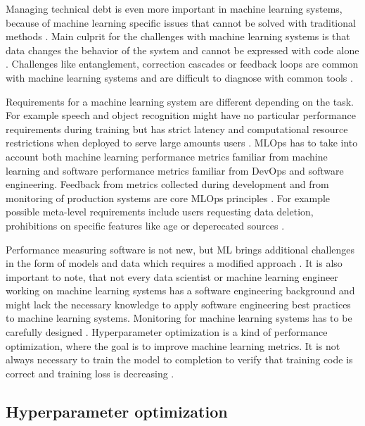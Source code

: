 Managing technical debt is even more important in machine learning systems, because of machine learning specific issues that cannot be solved with traditional methods \parencite{sculleyHiddenTechnicalDebt2015a}. Main culprit for the challenges with machine learning systems is that data changes the behavior of the system and cannot be expressed with code alone \parencite{sculleyHiddenTechnicalDebt2015a}. Challenges like entanglement, correction cascades or feedback loops are common with machine learning systems and are difficult to diagnose with common tools \parencite{sculleyHiddenTechnicalDebt2015a}.

Requirements for a machine learning system are different depending on the task. For example speech and object recognition might have no particular performance requirements during training but has strict latency and computational resource restrictions when deployed to serve large amounts users \parencite{hintonDistillingKnowledgeNeural2015}. MLOps has to take into account both machine learning performance metrics familiar from machine learning and software performance metrics familiar from DevOps and software engineering. Feedback from metrics collected during development and from monitoring of production systems are core MLOps principles \parencite{kreuzbergerMachineLearningOperations2023}. For example possible meta-level requirements include users requesting data deletion, prohibitions on specific features like age or deperecated sources \parencite{breckMLTestScore2017a}.

Performance measuring software is not new, but ML brings additional challenges in the form of models and data which requires a modified approach \parencite{breckMLTestScore2017a}. It is also important to note, that not every data scientist or machine learning engineer working on machine learning systems has a software engineering background \parencite{finzerDataScienceEducation2013} and might lack the necessary knowledge to apply software engineering best practices to machine learning systems. Monitoring for machine learning systems has to be carefully designed \parencite{sculleyHiddenTechnicalDebt2015a}. Hyperparameter optimization is a kind of performance optimization, where the goal is to improve machine learning metrics. It is not always necessary to train the model to completion to verify that training code is correct and training loss is decreasing \parencite{breckMLTestScore2017a}.


\subsection{Hyperparameter optimization}

